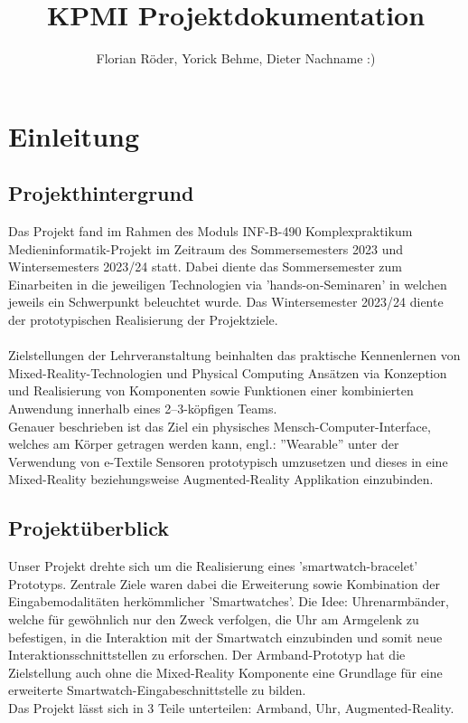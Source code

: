 \documentclass[11pt, a4paper]{article}
\begin{document}
\author{Florian Röder, Yorick Behme, Dieter Nachname :)}
\title{KPMI Projektdokumentation}
\maketitle
\setcounter{tocdepth}{4}
\setcounter{secnumdepth}{4}
\tableofcontents

\newpage

\section{Einleitung}

\subsection{Projekthintergrund}

Das Projekt fand im Rahmen des Moduls INF-B-490 Komplexpraktikum Medieninformatik-Projekt im Zeitraum des Sommersemesters 2023 und Wintersemesters 2023/24 statt. 
Dabei diente das Sommersemester zum Einarbeiten in die jeweiligen Technologien via 'hands-on-Seminaren' in welchen jeweils ein Schwerpunkt beleuchtet wurde. 
Das Wintersemester 2023/24 diente der prototypischen Realisierung der Projektziele.\\
\\
Zielstellungen der Lehrveranstaltung beinhalten das praktische Kennenlernen von Mixed-Reality-Technologien und Physical Computing Ansätzen via Konzeption und Realisierung von Komponenten sowie Funktionen einer kombinierten Anwendung innerhalb eines 2–3-köpfigen Teams.\\
Genauer beschrieben ist das Ziel ein physisches Mensch-Computer-Interface, welches am Körper getragen werden kann, engl.: ''Wearable'' unter der Verwendung von e-Textile Sensoren prototypisch umzusetzen und dieses in eine Mixed-Reality beziehungsweise Augmented-Reality Applikation einzubinden.

\subsection{Projektüberblick}

Unser Projekt drehte sich um die Realisierung eines 'smartwatch-bracelet' Prototyps. 
Zentrale Ziele waren dabei die Erweiterung sowie Kombination der Eingabemodalitäten herkömmlicher 'Smartwatches'. 
Die Idee: Uhrenarmbänder, welche für gewöhnlich nur den Zweck verfolgen, die Uhr am Armgelenk zu befestigen, in die Interaktion mit der Smartwatch einzubinden und somit neue Interaktionsschnittstellen zu erforschen. 
Der Armband-Prototyp hat die Zielstellung auch ohne die Mixed-Reality Komponente eine Grundlage für eine erweiterte Smartwatch-Eingabeschnittstelle zu bilden.\\
Das Projekt lässt sich in 3 Teile unterteilen: Armband, Uhr, Augmented-Reality.
\end{document}
